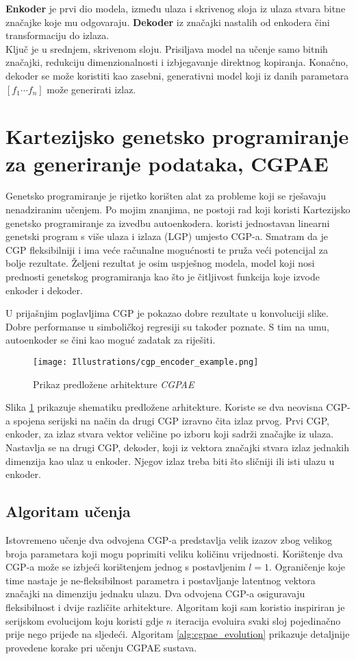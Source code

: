 \textbf{Enkoder} je prvi dio modela, između ulaza i skrivenog sloja iz ulaza stvara bitne značajke koje mu odgovaraju.
\textbf{Dekoder} iz značajki nastalih od enkodera čini transformaciju do izlaza. \\
Ključ je u srednjem, skrivenom sloju.
Prisiljava model na učenje samo bitnih značajki, redukciju dimenzionalnosti i izbjegavanje direktnog kopiranja.
Konačno, dekoder se može koristiti kao zasebni, generativni model koji iz danih parametara $[f_1 \cdots f_n]$ može generirati izlaz.

\section{Kartezijsko genetsko programiranje za generiranje podataka, CGPAE}
Genetsko programiranje je rijetko korišten alat za probleme koji se rješavaju nenadziranim učenjem.
Po mojim znanjima, ne postoji rad koji koristi Kartezijsko genetsko programiranje za izvedbu autoenkodera.
\cite{why_ae_diff} koristi jednostavan linearni genetski program s više ulaza i izlaza (LGP) umjesto CGP-a.
Smatram da je CGP fleksibilniji i ima veće računalne mogućnosti te pruža veći potencijal za bolje rezultate.
Željeni rezultat je osim uspješnog modela, model koji nosi prednosti genetskog programiranja kao što je čitljivost funkcija koje izvode enkoder i dekoder.

U prijašnjim poglavljima CGP je pokazao dobre rezultate u konvoluciji slike.
Dobre performanse u simboličkoj regresiji su također poznate.
S tim na umu, autoenkoder se čini kao moguć zadatak za riješiti.

\begin{figure}[H]
	\centering
	\texttt{[image: Illustrations/cgp\_encoder\_example.png]}
	\caption{Prikaz predložene arhitekture \emph{CGPAE}}
	\label{fig:cgpae}
\end{figure}

Slika \ref{fig:cgpae} prikazuje shematiku predložene arhitekture.
Koriste se dva neovisna CGP-a spojena serijski na način da drugi CGP izravno čita izlaz prvog.
Prvi CGP, enkoder, za izlaz stvara vektor veličine po izboru koji sadrži značajke iz ulaza.
Nastavlja se na drugi CGP, dekoder, koji iz vektora značajki stvara izlaz jednakih dimenzija kao ulaz u enkoder.
Njegov izlaz treba biti što sličniji ili isti ulazu u enkoder.

\subsection{Algoritam učenja}
Istovremeno učenje dva odvojena CGP-a predstavlja velik izazov zbog velikog broja parametara koji mogu poprimiti veliku količinu vrijednosti.
Korištenje dva CGP-a može se izbjeći korištenjem jednog s postavljenim $l = 1$.
Ograničenje koje time nastaje je ne-fleksibilnost parametra i postavljanje latentnog vektora značajki na dimenziju jednaku ulazu.
Dva odvojena CGP-a osiguravaju fleksibilnost i dvije različite arhitekture.
Algoritam koji sam koristio inspiriran je serijskom evolucijom koju koristi \cite{conv_gen_programming} gdje $n$ iteracija evoluira svaki sloj pojedinačno prije nego prijeđe na sljedeći.
Algoritam \ref{alg:cgpae_evolution} prikazuje detaljnije provedene korake pri učenju CGPAE sustava.

